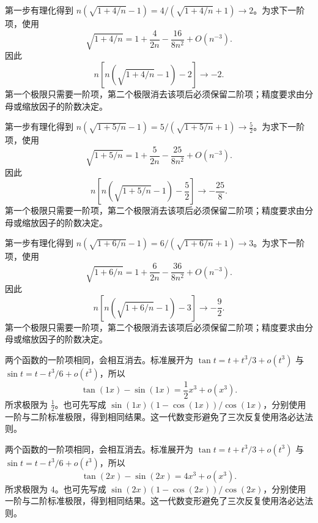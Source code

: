 \documentclass[12pt,fontset=fandol]{ctexart}
\begin{document}
\begin{solve}\label{ans:c5q10}
第一步有理化得到 $n(\sqrt{1+4/n}-1)=4/(\sqrt{1+4/n}+1)\to 2$。为求下一阶项，使用
\[
\sqrt{1+4/n}=1+\frac{4}{2n}-\frac{16}{8n^2}+O(n^{-3}).
\]
因此
\[
n\left[n\left(\sqrt{1+4/n}-1\right)-2\right]\longrightarrow-2.
\]
第一个极限只需要一阶项，第二个极限消去该项后必须保留二阶项；精度要求由分母或缩放因子的阶数决定。
\end{solve}

\begin{solve}\label{ans:c5q11}
第一步有理化得到 $n(\sqrt{1+5/n}-1)=5/(\sqrt{1+5/n}+1)\to \frac{5}{2}$。为求下一阶项，使用
\[
\sqrt{1+5/n}=1+\frac{5}{2n}-\frac{25}{8n^2}+O(n^{-3}).
\]
因此
\[
n\left[n\left(\sqrt{1+5/n}-1\right)-\frac{5}{2}\right]\longrightarrow-\frac{25}{8}.
\]
第一个极限只需要一阶项，第二个极限消去该项后必须保留二阶项；精度要求由分母或缩放因子的阶数决定。
\end{solve}

\begin{solve}\label{ans:c5q12}
第一步有理化得到 $n(\sqrt{1+6/n}-1)=6/(\sqrt{1+6/n}+1)\to 3$。为求下一阶项，使用
\[
\sqrt{1+6/n}=1+\frac{6}{2n}-\frac{36}{8n^2}+O(n^{-3}).
\]
因此
\[
n\left[n\left(\sqrt{1+6/n}-1\right)-3\right]\longrightarrow-\frac{9}{2}.
\]
第一个极限只需要一阶项，第二个极限消去该项后必须保留二阶项；精度要求由分母或缩放因子的阶数决定。
\end{solve}

\begin{solve}\label{ans:c5q13}
两个函数的一阶项相同，会相互消去。标准展开为 $\tan t=t+t^3/3+o(t^3)$ 与 $\sin t=t-t^3/6+o(t^3)$，所以
\[
\tan(1x)-\sin(1x)=\frac{1}{2}x^3+o(x^3).
\]
所求极限为 $\frac{1}{2}$。也可先写成 $\sin(1x)(1-\cos(1x))/\cos(1x)$，分别使用一阶与二阶标准极限，得到相同结果。这一代数变形避免了三次反复使用洛必达法则。
\end{solve}

\begin{solve}\label{ans:c5q14}
两个函数的一阶项相同，会相互消去。标准展开为 $\tan t=t+t^3/3+o(t^3)$ 与 $\sin t=t-t^3/6+o(t^3)$，所以
\[
\tan(2x)-\sin(2x)=4x^3+o(x^3).
\]
所求极限为 $4$。也可先写成 $\sin(2x)(1-\cos(2x))/\cos(2x)$，分别使用一阶与二阶标准极限，得到相同结果。这一代数变形避免了三次反复使用洛必达法则。
\end{solve}
\end{document}
